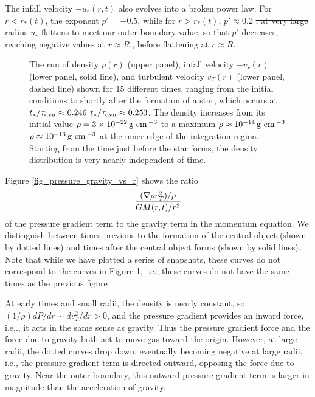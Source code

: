 \documentclass[iop,apj,numberedappendix]{emulateapj}
\newcommand       \phil[1]      {{\color{blue} #1}}
\newcommand       \be		{\begin{equation}}
\newcommand       \ee		{\end{equation}}
\newcommand       \cm		{\,{\rm cm \,}}
\newcommand       \g		{\,{\rm g \,}}
\newcommand       \tdyn         {\tau_{\rm dyn}}
\begin{document}
The infall velocity $-u_r(r,t)$ also evolves into a broken power
law. For $r<r_*(t)$, the exponent $p'=-0.5$, while for $r>r_*(t)$,
$p'\approx 0.2$\phil{\sout{; at very large radius $u_r$ flattens to meet our
outer boundary value, so that $p'$
decreases, reaching negative values at $r\approx R$.}, before flattening at $r \approx R$.}

\begin{figure}
\caption{\label{fig_rho_v_vs_r_080}The run of density $\rho(r)$ (upper
  panel), infall velocity $-v_r(r)$ (lower panel, solid line), and
  turbulent velocity $v_T(r)$ (lower panel, dashed line) shown for 15
  different times, ranging from the initial conditions to shortly
  after the formation of a star, which occurs at
  \phil{\sout{$t_*/\tdyn\approx0.246$} $t_*/\tdyn\approx0.253$}. The density increases from its initial value
  $\bar\rho=3\times10^{-22}\g\cm^{-3}$ to a maximum
  \phil{\sout{$\rho\approx10^{-14}\g\cm^{-3}$}$\rho\approx10^{-13}\g\cm^{-3}$} at the inner edge of the integration
  region. Starting from the time just before the star forms, the
  density distribution is very nearly independent of time. }
\end{figure}


Figure \ref{fig_pressure_gravity_vs_r} shows the ratio
% 
\be  %
{(\nabla\rho v_T^2)/\rho \over {GM(r,t)/r^2}}
\ee  %
%
of the pressure gradient term to the gravity term in the
momentum equation. We distinguish between times previous to the
formation of the central object (shown by dotted lines) and times
after the central object forms (shown by solid lines). \phil{Note that while we have plotted a series of snapshots, these curves do not correspond to the curves in Figure \ref{fig_rho_v_vs_r_080}, i.e., these curves do not have the same times as the previous figure} 

At early times and small radii, the density is nearly constant, so
$(1/\rho)dP/dr\sim dv_T^2/dr>0$, and the pressure gradient provides an
inward force, i.e,., it acts in the same sense as gravity. Thus the
pressure gradient force and the force due to gravity both act to move
gas toward the origin. However, at large radii, the dotted curves drop
down, eventually becoming negative at large radii, i.e.,
the pressure gradient term is directed outward, opposing the force due
to gravity. Near the outer boundary, this outward pressure gradient
term is larger in magnitude than the acceleration of gravity.
\end{document}
